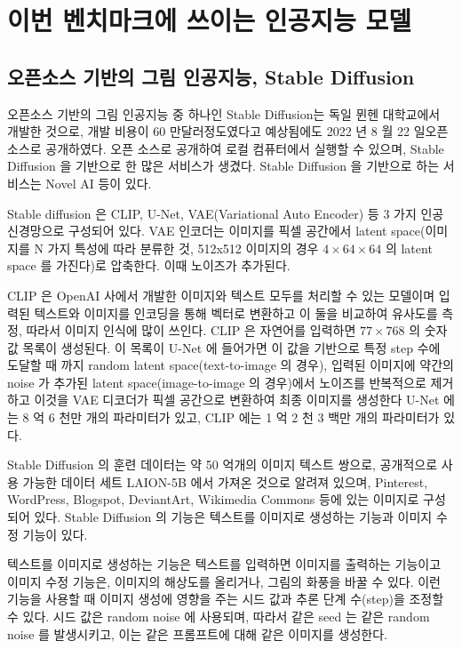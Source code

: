 \section{이번 벤치마크에 쓰이는 인공지능 모델}
\subsection{오픈소스 기반의 그림 인공지능, Stable Diffusion}
오픈소스 기반의 그림 인공지능 중 하나인 Stable Diffusion\cite{rombach2022highresolution}는 독일 뮌헨 대학교에서
개발한 것으로, 개발 비용이 60 만달러정도였다고 예상됨에도\cite{matthias2022training} 2022 년 8 월
22 일오픈소스로 공개하였다\cite{stability2022stable}. 오픈 소스로 공개하여 로컬 컴퓨터에서 실행할 수 있으며,
Stable Diffusion 을 기반으로 한 많은 서비스가 생겼다. Stable Diffusion 을 기반으로 하는
서비스는 Novel AI 등이 있다.

Stable diffusion 은 CLIP\cite{radford2021learning}, U-Net, VAE(Variational Auto Encoder) 등 3 가지 인공신경망으로
구성되어 있다. VAE 인코더는 이미지를 픽셀 공간에서 latent space(이미지를 N 가지 특성에
따라 분류한 것, 512x512 이미지의 경우 $4\times 64\times 64$ 의 latent space 를 가진다)로 압축한다. 이때
노이즈가 추가된다.

CLIP 은 OpenAI 사에서 개발한 이미지와 텍스트 모두를 처리할 수 있는 모델이며 입력된
텍스트와 이미지를 인코딩을 통해 벡터로 변환하고 이 둘을 비교하여 유사도를 측정,
따라서 이미지 인식에 많이 쓰인다. CLIP 은 자연어를 입력하면 $77\times 768$ 의 숫자 값 목록이
생성된다. 이 목록이 U-Net 에 들어가면 이 값을 기반으로 특정 step 수에 도달할 때 까지
random latent space(text-to-image 의 경우), 입력된 이미지에 약간의 noise 가 추가된 latent 
space(image-to-image 의 경우)에서 노이즈를 반복적으로 제거하고 이것을 VAE 디코더가
픽셀 공간으로 변환하여 최종 이미지를 생성한다 U-Net 에는 8 억 6 천만 개의 파라미터가
있고, CLIP 에는 1 억 2 천 3 백만 개의 파라미터가 있다.

Stable Diffusion 의 훈련 데이터는 약 50 억개의 이미지 텍스트 쌍으로, 공개적으로 사용
가능한 데이터 세트 LAION-5B 에서 가져온 것으로 알려져 있으며, Pinterest, WordPress, 
Blogspot, DeviantArt, Wikimedia Commons 등에 있는 이미지로 구성되어 있다\cite{wiki:Stable_Diffusion}.
Stable Diffusion 의 기능은 텍스트를 이미지로 생성하는 기능과 이미지 수정 기능이 있다.

텍스트를 이미지로 생성하는 기능은 텍스트를 입력하면 이미지를 출력하는 기능이고
이미지 수정 기능은, 이미지의 해상도를 올리거나, 그림의 화풍을 바꿀 수 있다. 이런 기능을
사용할 때 이미지 생성에 영향을 주는 시드 값과 추론 단계 수(step)을 조정할 수 있다. 시드
값은 random noise 에 사용되며, 따라서 같은 seed 는 같은 random noise 를 발생시키고, 이는
같은 프롬프트에 대해 같은 이미지를 생성한다. 

